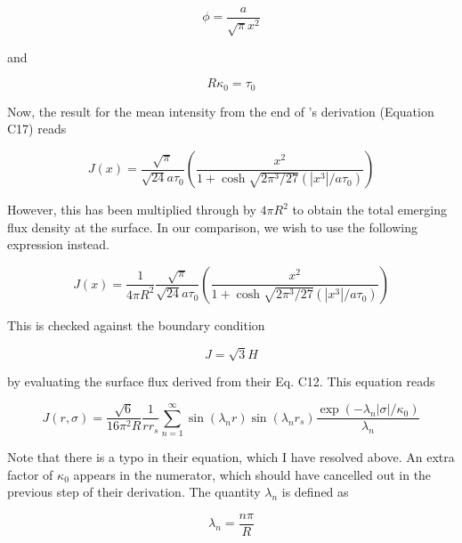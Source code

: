 \documentclass[onecolumn]{aastex63}
\begin{document}
\begin{equation} \label{lineprofile}
    \phi = \frac{a}{\sqrt{\pi} x^2}
\end{equation}

and

\begin{equation} \label{tau}
    R\kappa_0 = \tau_0
\end{equation}

Now, the result for the mean intensity from the end of \cite{2006ApJ...649...14D}'s derivation (Equation C17) reads

\begin{equation} \label{dijkstra}
    J(x) = \frac{\sqrt{\pi}}{\sqrt{24}a\tau_0}\left(\frac{x^2}{1 + \cosh{\sqrt{2\pi^3/27}(|x^3|/a\tau_0)}}\right)
\end{equation}

However, this has been multiplied through by $4\pi R^2$ to obtain the total emerging flux density at the surface. In our comparison, we wish to use the following expression instead.

\begin{equation} \label{c17/4piR^2}
    J(x) = \frac{1}{4\pi R^2}\frac{\sqrt{\pi}}{\sqrt{24}a\tau_0}\left(\frac{x^2}{1 + \cosh{\sqrt{2\pi^3/27}(|x^3|/a\tau_0)}}\right)
\end{equation}

This is checked against the boundary condition

\begin{equation} \label{bc}
    J = \sqrt{3} H
\end{equation}

by evaluating the surface flux derived from their Eq. C12. This equation reads 

\begin{equation} \label{c12}
    J(r, \sigma) = \frac{\sqrt{6}}{16 \pi^2 R} \frac{1}{rr_s} \sum_{n=1}^{\infty}\sin(\lambda_n r) \sin(\lambda_n r_s) \frac{\exp{(-\lambda_n |\sigma|/\kappa_0)}}{\lambda_n}
\end{equation}

Note that there is a typo in their equation, which I have resolved above. An extra factor of $\kappa_0$ appears in the numerator, which should have cancelled out in the previous step of their derivation. The quantity $\lambda_n$ is defined as 

\begin{equation} \label{lambdan}
    \lambda_n = \frac{n\pi}{R}
\end{equation}
\end{document}
